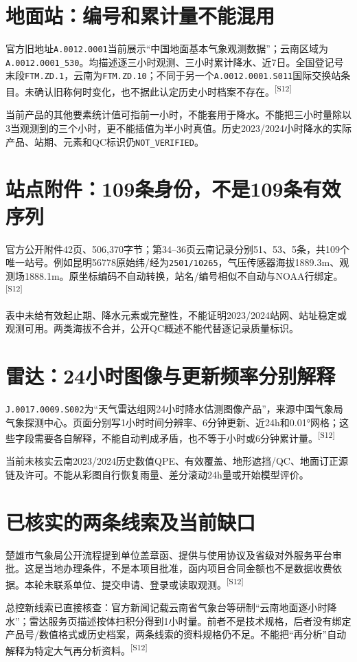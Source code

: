 \documentclass[UTF8,10.5pt,a4paper,fontset=none]{ctexart}
\newcommand{\evi}[1]{\textsuperscript{\color{muted}[#1]}}
\begin{document}
\section*{地面站：编号和累计量不能混用}
官方旧地址\texttt{A.0012.0001}当前展示“中国地面基本气象观测数据”；云南区域为\texttt{A.0012.0001\_530}。均描述逐三小时观测、三小时累计降水、近7日。全国登记号末段\texttt{FTM.ZD.1}，云南为\texttt{FTM.ZD.10}；不同于另一个\texttt{A.0012.0001.S011}国际交换站条目。未确认旧称何时变化，也不据此认定历史小时档案不存在。\evi{S12}

当前产品的其他要素统计值可指前一小时，不能套用于降水。不能把三小时量除以3当观测到的三个小时，更不能插值为半小时真值。历史2023/2024小时降水的实际产品、站期、元素和QC标识仍\texttt{NOT\_VERIFIED}。

\section*{站点附件：109条身份，不是109条有效序列}
官方公开附件42页、506,370字节；第34--36页云南记录分别51、53、5条，共109个唯一站号。例如昆明56778原始纬/经为\texttt{2501/10265}，气压传感器海拔1889.3m、观测场1888.1m。原坐标编码不自动转换，站名/编号相似不自动与NOAA行绑定。\evi{S12}

表中未给有效起止期、降水元素或完整性，不能证明2023/2024站网、站址稳定或观测可用。两类海拔不合并，公开QC概述不能代替逐记录质量标识。

\section*{雷达：24小时图像与更新频率分别解释}
\texttt{J.0017.0009.S002}为“天气雷达组网24小时降水估测图像产品”，来源中国气象局气象探测中心。页面分别写1小时时间分辨率、6分钟更新、近24h和0.01°网格；这些字段需要各自解释，不能自动判成矛盾，也不等于小时或6分钟累计量。\evi{S12}

当前未核实云南2023/2024历史数值QPE、有效覆盖、地形遮挡/QC、地面订正源链及许可。不能从彩图自行恢复雨量、差分滚动24h量或开始模型评价。

\section*{已核实的两条线索及当前缺口}
楚雄市气象局公开流程提到单位盖章函、提供与使用协议及省级对外服务平台审批。这是当地办理条件，不是本项目批准，函内项目合同金额也不是数据收费依据。本轮未联系单位、提交申请、登录或读取观测。\evi{S12}

总控新线索已直接核查：官方新闻记载云南省气象台等研制“云南地面逐小时降水”；雷达服务页描述按体扫积分得到1小时量。前者不是技术规格，后者没有绑定产品号/数值格式或历史档案，两条线索的资料规格仍不足。不能把“再分析”自动解释为特定大气再分析资料。\evi{S12}
\end{document}
